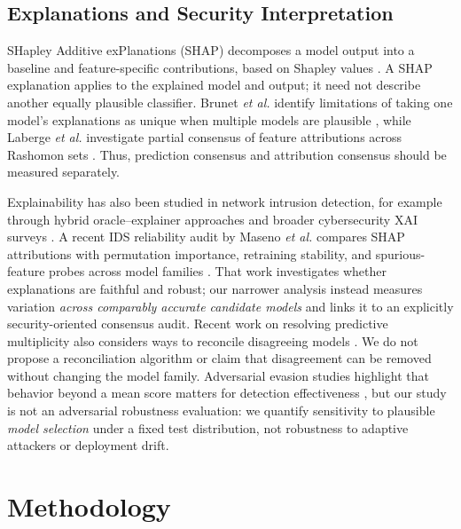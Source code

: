 \documentclass[10pt,conference]{IEEEtran}
\begin{document}
\subsection{Explanations and Security Interpretation}
SHapley Additive exPlanations (SHAP) decomposes a model output into a baseline and feature-specific contributions, based on Shapley values \cite{shapley1953,lundberg2017}. A SHAP explanation applies to the explained model and output; it need not describe another equally plausible classifier. Brunet \emph{et al.} identify limitations of taking one model's explanations as unique when multiple models are plausible \cite{brunet2022}, while Laberge \emph{et al.} investigate partial consensus of feature attributions across Rashomon sets \cite{laberge2023}. Thus, prediction consensus and attribution consensus should be measured separately.

Explainability has also been studied in network intrusion detection, for example through hybrid oracle--explainer approaches \cite{szczepanski2020} and broader cybersecurity XAI surveys \cite{zhang2022}. A recent IDS reliability audit by Maseno \emph{et al.} compares SHAP attributions with permutation importance, retraining stability, and spurious-feature probes across model families \cite{maseno2026}. That work investigates whether explanations are faithful and robust; our narrower analysis instead measures variation \emph{across comparably accurate candidate models} and links it to an explicitly security-oriented consensus audit. Recent work on resolving predictive multiplicity also considers ways to reconcile disagreeing models \cite{haghighat2026}. We do not propose a reconciliation algorithm or claim that disagreement can be removed without changing the model family. Adversarial evasion studies highlight that behavior beyond a mean score matters for detection effectiveness \cite{pawlicki2020}, but our study is not an adversarial robustness evaluation: we quantify sensitivity to plausible \emph{model selection} under a fixed test distribution, not robustness to adaptive attackers or deployment drift.

\section{Methodology}
\end{document}
